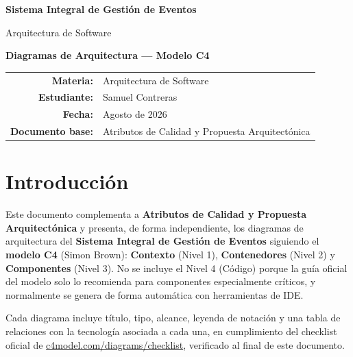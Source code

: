 \documentclass[12pt,a4paper]{article}
\begin{document}
\begin{titlepage}
\centering
\vspace*{2cm}
{\Huge\bfseries Sistema Integral de Gestión de Eventos\par}
\vspace{0.7cm}
{\Large Arquitectura de Software\par}
\vspace{1.2cm}
{\Large\bfseries Diagramas de Arquitectura --- Modelo C4\par}
\vspace{2cm}
\vfill
\begin{tabular}{rl}
\textbf{Materia:} & Arquitectura de Software\\
\textbf{Estudiante:} & Samuel Contreras\\
\textbf{Fecha:} & Agosto de 2026\\
\textbf{Documento base:} & Atributos de Calidad y Propuesta Arquitectónica
\end{tabular}
\end{titlepage}

\tableofcontents
\newpage

\section{Introducción}

Este documento complementa a \textbf{Atributos de Calidad y Propuesta Arquitectónica} y presenta,
de forma independiente, los diagramas de arquitectura del \textbf{Sistema Integral de Gestión de
Eventos} siguiendo el \textbf{modelo C4} (Simon Brown): \textbf{Contexto} (Nivel 1),
\textbf{Contenedores} (Nivel 2) y \textbf{Componentes} (Nivel 3). No se incluye el Nivel 4
(Código) porque la guía oficial del modelo solo lo recomienda para componentes especialmente
críticos, y normalmente se genera de forma automática con herramientas de IDE.

Cada diagrama incluye título, tipo, alcance, leyenda de notación y una tabla de relaciones con la
tecnología asociada a cada una, en cumplimiento del checklist oficial de
\href{https://c4model.com/diagrams/checklist}{c4model.com/diagrams/checklist}, verificado al
final de este documento.
\end{document}
